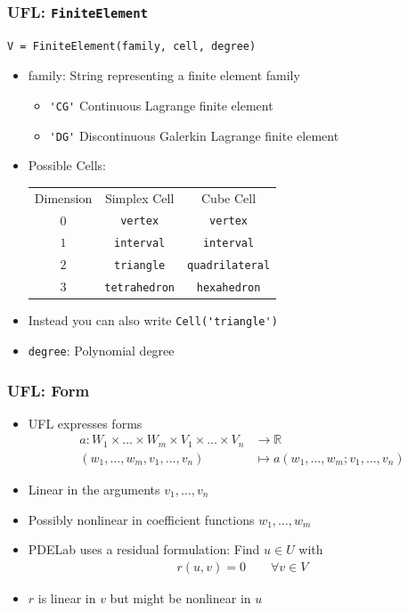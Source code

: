 \documentclass[ignorenonframetext,11pt]{beamer}
\theoremstyle{definition}
\begin{document}
\begin{frame}[fragile]
  \frametitle{UFL: \lstinline{FiniteElement}}
  \begin{lstlisting}
V = FiniteElement(family, cell, degree)
  \end{lstlisting}
  \vfill
  \begin{itemize}
  \item family: String representing a finite element family
    \begin{itemize}
    \item \lstinline{'CG'} Continuous Lagrange finite element
    \item \lstinline{'DG'} Discontinuous Galerkin Lagrange finite element
    \end{itemize}
  \item Possible Cells:
    \begin{tabu}{ccc}
      Dimension & Simplex Cell & Cube Cell \\
      $0$ & \lstinline{vertex} & \lstinline{vertex} \\
      $1$ & \lstinline{interval} & \lstinline{interval} \\
      $2$ & \lstinline{triangle} & \lstinline{quadrilateral} \\
      $3$ & \lstinline{tetrahedron} & \lstinline{hexahedron} \\
    \end{tabu}
  \item Instead you can also write \lstinline{Cell('triangle')}
  \item \lstinline{degree}: Polynomial degree
  \end{itemize}
\end{frame}

\begin{frame}
  \frametitle{UFL: Form}
  \begin{itemize}
  \item UFL expresses forms
    \begin{align*}
      a: W_1\times\dots\times W_m\times V_1\times\dots\times V_n & \rightarrow \mathbb{R} \\
      (w_1,\dots ,w_m,v_1,\dots ,v_n) & \mapsto a(w_1,\dots ,w_m;v_1,\dots ,v_n)
    \end{align*}
  \item Linear in the arguments $v_1,\dots,v_n$
  \item Possibly nonlinear in coefficient functions $w_1,\dots,w_m$
  \item PDELab uses a residual formulation: Find $u\in U$ with
    \begin{align*}
      r(u,v) = 0 \qquad \forall v \in V
    \end{align*}
  \item $r$ is linear in $v$ but might be nonlinear in $u$
  \end{itemize}
\end{frame}
\end{document}
